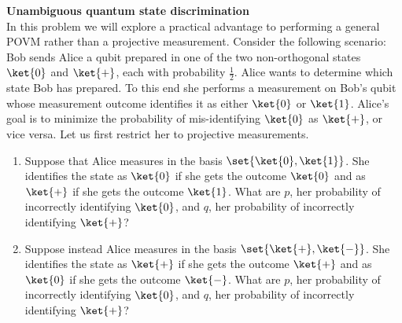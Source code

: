 \begin{exercises}
\item {\bf Unambiguous quantum state discrimination}\\
In this problem we will explore a practical advantage to performing a general POVM rather than a projective measurement. Consider the following scenario: Bob sends Alice a qubit prepared in one of the two non-orthogonal states $\ket{0}$ and $\ket{+}$, each with probability $\frac{1}{2}$. Alice wants to determine which state Bob has prepared. To this end she performs a measurement on Bob's qubit whose measurement outcome identifies it as either $\ket{0}$ or $\ket{1}$. Alice's goal is to minimize the probability of mis-identifying $\ket{0}$ as $\ket{+}$, or vice versa. Let us first restrict her to projective measurements.
\begin{enumerate}
\item Suppose that Alice measures in the basis $\set{\ket{0},\ket{1}}$. She identifies the state as $\ket{0}$ if she gets the outcome $\ket{0}$ and as $\ket{+}$ if she gets the outcome $\ket{1}$. What are $p$, her probability of incorrectly identifying $\ket{0}$, and $q$, her probability of incorrectly identifying $\ket{+}$?
\item Suppose instead Alice measures in the basis $\set{\ket{+},\ket{-}}$. She identifies the state as $\ket{+}$ if she gets the outcome $\ket{+}$ and as $\ket{0}$ if she gets the outcome $\ket{-}$. What are $p$, her probability of incorrectly identifying $\ket{0}$, and $q$, her probability of incorrectly identifying $\ket{+}$?

\end{enumerate}
\end{exercises}
